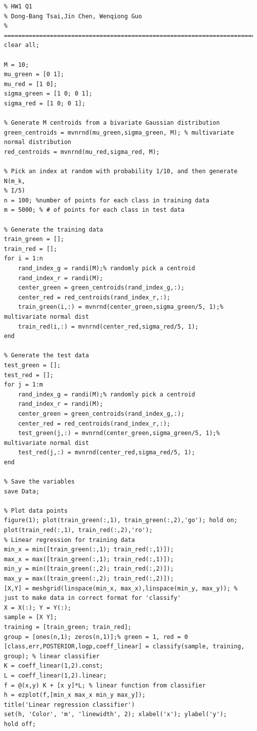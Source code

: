\documentclass[pra,groupedaddress,amsmath,amssymb, column]{revtex4}
\begin{document}
\begin{verbatim}
% HW1 Q1
% Dong-Bang Tsai,Jin Chen, Wenqiong Guo
% =========================================================================
clear all;

M = 10;
mu_green = [0 1]; 
mu_red = [1 0];
sigma_green = [1 0; 0 1];
sigma_red = [1 0; 0 1];

% Generate M centroids from a bivariate Gaussian distribution
green_centroids = mvnrnd(mu_green,sigma_green, M); % multivariate normal distribution
red_centroids = mvnrnd(mu_red,sigma_red, M);

% Pick an index at random with probability 1/10, and then generate N(m_k,
% I/5)
n = 100; %number of points for each class in training data
m = 5000; % # of points for each class in test data

% Generate the training data
train_green = [];
train_red = [];
for i = 1:n
    rand_index_g = randi(M);% randomly pick a centroid
    rand_index_r = randi(M); 
    center_green = green_centroids(rand_index_g,:); 
    center_red = red_centroids(rand_index_r,:);
    train_green(i,:) = mvnrnd(center_green,sigma_green/5, 1);% multivariate normal dist
    train_red(i,:) = mvnrnd(center_red,sigma_red/5, 1); 
end

% Generate the test data
test_green = [];
test_red = [];
for j = 1:m
    rand_index_g = randi(M);% randomly pick a centroid
    rand_index_r = randi(M); 
    center_green = green_centroids(rand_index_g,:); 
    center_red = red_centroids(rand_index_r,:);
    test_green(j,:) = mvnrnd(center_green,sigma_green/5, 1);% multivariate normal dist
    test_red(j,:) = mvnrnd(center_red,sigma_red/5, 1);
end

% Save the variables
save Data;

% Plot data points
figure(1); plot(train_green(:,1), train_green(:,2),'go'); hold on;
plot(train_red(:,1), train_red(:,2),'ro'); 
% Linear regression for training data
min_x = min([train_green(:,1); train_red(:,1)]);
max_x = max([train_green(:,1); train_red(:,1)]);
min_y = min([train_green(:,2); train_red(:,2)]);
max_y = max([train_green(:,2); train_red(:,2)]);
[X,Y] = meshgrid(linspace(min_x, max_x),linspace(min_y, max_y)); % just to make data in correct format for 'classify'
X = X(:); Y = Y(:);
sample = [X Y];
training = [train_green; train_red];
group = [ones(n,1); zeros(n,1)];% green = 1, red = 0
[class,err,POSTERIOR,logp,coeff_linear] = classify(sample, training, group); % linear classifier
K = coeff_linear(1,2).const;
L = coeff_linear(1,2).linear; 
f = @(x,y) K + [x y]*L; % linear function from classifier
h = ezplot(f,[min_x max_x min_y max_y]);
title('Linear regression classifier')
set(h, 'Color', 'm', 'linewidth', 2); xlabel('x'); ylabel('y');
hold off;


\end{verbatim}
\end{document}
